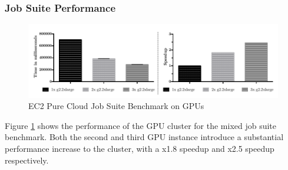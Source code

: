 \subsubsection*{Job Suite Performance}

\begin{figure}[H]	
	\includegraphics[width=1.0\textwidth]{images/ec2_gpu_full_benchmark.pdf}
	\centering
	\caption{EC2 Pure Cloud Job Suite Benchmark on GPUs}
	\label{img:ec2_gpu_full_benchmark}
\end{figure}

Figure \ref{img:ec2_gpu_full_benchmark} shows the performance of the GPU cluster for the mixed job suite benchmark. Both the second and third GPU instance introduce a substantial performance increase to the cluster, with a x1.8 speedup and x2.5 speedup respectively.

